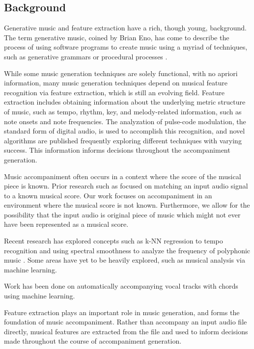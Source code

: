 \documentclass[11pt,conference,letterpaper]{IEEEtran}
\begin{document}
\subsection{Background}

Generative music and feature extraction have a rich, though young, background. The term generative music, coined by Brian Eno, has come to describe the process of using software programs to create music using a myriad of techniques, such as generative grammars or procedural processes \cite{wooller2005framework}.

While some music generation techniques are solely functional, with no apriori information, many music generation techniques depend on musical feature recognition via feature extraction, which is still an evolving field. Feature extraction includes obtaining information about the underlying metric structure of music, such as tempo, rhythm, key, and melody-related information, such as note onsets and note frequencies. The analyzation of pulse-code modulation, the standard form of digital audio, is used to accomplish this recognition, and novel algorithms are published frequently exploring different techniques with varying success. This information informs decisions throughout the accompaniment generation. 

Music accompaniment often occurs in a context where the score of the musical piece is known. Prior research such as \cite{dannenberg1984line} focused on matching an input audio signal to a known musical score. Our work focuses on accompaniment in an environment where the musical score is not known. Furthermore, we allow for the possibility that the input audio is original piece of music which might not ever have been represented as a musical score.

Recent research has explored concepts such as k-NN regression to tempo recognition \cite{eronen2010music} and using spectral smoothness to analyze the frequency of polyphonic music \cite{klapuri2003multiple}. Some areas have yet to be heavily explored, such as musical analysis via machine learning.

Work has been done on automatically accompanying vocal tracks with chords \cite{simon2008mysong} using machine learning. \cite{morris2008exposing}

Feature extraction plays an important role in music generation, and forms the foundation of music accompaniment. Rather than accompany an input audio file directly, musical features are extracted from the file and used to inform decisions made throughout the course of accompaniment generation.
\end{document}
